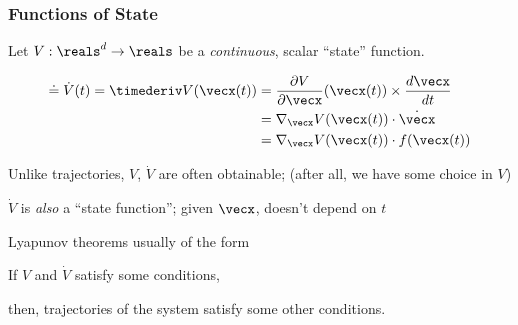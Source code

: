\documentclass[12pt]{beamer}
\begin{document}
\begin{frame}
\frametitle{Functions of State}

\begin{itemize}
\vitem
Let $V : \reals^d \to \reals$ be a \emph{continuous}, scalar ``state'' function.

\[
\begin{aligned}
\doteq \dot V(t) = 
\timederiv V(\vecx(t))
	&= \frac{\partial V}{\partial \vecx} (\vecx(t)) \times \frac{d\vecx}{dt}	\\
	&= \nabla_\vecx V(\vecx(t)) \cdot \dot\vecx	\\
	&= \nabla_\vecx V(\vecx(t)) \cdot f(\vecx(t))	\\
\end{aligned}
\]

\vitem
Unlike trajectories, $V$, $\dot V$ are often obtainable;
(after all, we have some choice in $V$)

\vitem
$\dot V$ is \emph{also} a ``state function''; given $\vecx$, doesn't depend on $t$

\vitem
Lyapunov theorems usually of the form

If $V$ and $\dot V$ satisfy some conditions,

then, trajectories of the system satisfy some other conditions.

\end{itemize}

\end{frame}
\end{document}

